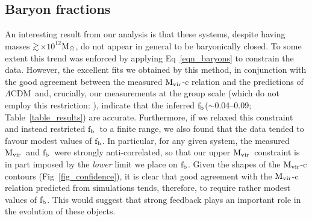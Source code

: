 \documentclass{emulateapj}
\def\spose#1{\hbox to 0pt{#1\hss}}
\def\gtsim{$\mathrel{\spose{\lower 3pt\hbox{$\sim$}} 
        \raise 2.0pt\hbox{$>$}}$\thinspace}
\def \msun {${\rm M_\odot}$}
\newcommand{\mvir}{${\rm M_{vir}}$}
\newcommand{\lcdm}{$\Lambda$CDM}
\newcommand{\fbaryons}{${\rm f_{b}}$}
\begin{document}
\subsection{Baryon fractions}
An interesting result from our analysis is that these systems,
despite having masses \gtsim 5$\times 10^{12}$\msun,
do not appear in general to be baryonically closed.
To some extent this trend was enforced by applying 
Eq~\ref{eqn_baryons} to constrain the data. However, 
the excellent fits we obtained by this method, in
conjunction with 
the good agreement between the measured \mvir-c relation
and the predictions of \lcdm\ and, crucially,
our measurements at the group scale (which do not 
employ this restriction: \citealt{gastaldello06a}),
indicate that the inferred \fbaryons ($\sim$0.04--0.09; Table~\ref{table_results})
are accurate.
Furthermore, if we relaxed this constraint
and instead restricted \fbaryons\ to a finite range, we 
also found that the data tended to favour modest values of \fbaryons. In particular,
for any given system, the measured \mvir\ and \fbaryons\ were 
strongly anti-correlated, so that our upper \mvir\ constraint
is in part imposed by the {\em lower} limit we place on \fbaryons. 
Given the shapes of the \mvir-c contours (Fig~\ref{fig_confidence}),
it is clear that good agreement with the \mvir-c relation predicted
from simulations tends, therefore, to require rather modest values of \fbaryons.
This would suggest that strong feedback plays an important 
role in the evolution of these objects.
\end{document}
